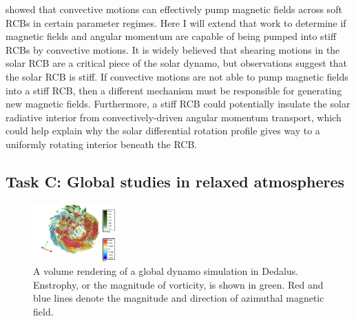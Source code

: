 \documentclass[11pt, preprint]{aastex}
\begin{document}
\citet{tobias&all1998} showed that convective motions can effectively pump magnetic fields across soft RCBs in certain parameter regimes.
Here I will extend that work  to determine if magnetic fields and angular momentum are capable of being pumped into stiff RCBs by convective motions.
It is widely believed that shearing motions in the solar RCB are a critical piece of the solar dynamo, but observations \citep{basu1997} suggest that the solar RCB is stiff.
If convective motions are not able to pump magnetic fields into a stiff RCB, then a different mechanism must be responsible for generating new magnetic fields.
Furthermore, a stiff RCB could potentially insulate the solar radiative interior from convectively-driven angular momentum transport, which could help explain why the solar differential rotation profile gives way to a uniformly rotating interior beneath the RCB.

\vspace{-0.8cm}
\subsection*{Task C: Global studies in relaxed atmospheres}
\vspace{-0.3cm}
\label{sct:taskC}

\begin{figure}
	\begin{center}
	\vspace{-10pt}
    \includegraphics[width=0.28\textwidth]{./figs/mdwarf.png}
	\vspace{-16pt}
	\end{center}
    \caption{A volume rendering of a global dynamo simulation in Dedalus.
	Enstrophy, or the magnitude of vorticity, is shown in green.
	Red and blue lines denote the magnitude and direction of azimuthal magnetic field.
	\label{fig:mdwarf} }
\end{figure}
\end{document}
